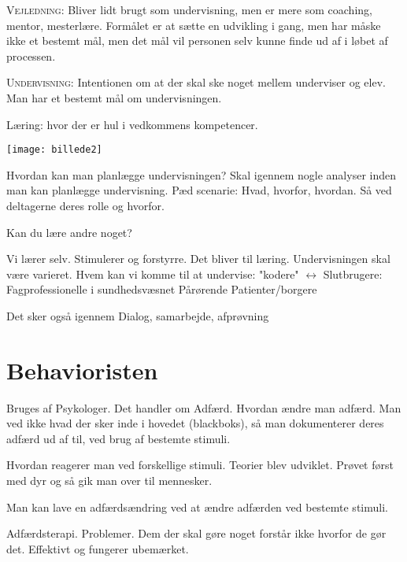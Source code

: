 \documentclass[12pt, letterpaper]{article}
\begin{document}
\textsc {Vejledning}: 
Bliver lidt brugt som undervisning, men er mere som coaching, mentor, mesterlære. Formålet er at sætte en udvikling i gang, men har måske ikke et bestemt mål, men det mål vil personen selv kunne finde ud af i løbet af processen. \newline 



\textsc {Undervisning}:
Intentionen om at der skal ske noget mellem underviser og elev. Man har et bestemt mål om undervisningen. 


Læring: hvor der er hul i vedkommens kompetencer. 

\begin{center}
\texttt{[image: billede2]}
\end{center}

Hvordan kan man planlægge undervisningen? Skal igennem nogle analyser inden man kan planlægge undervisning. Pæd scenarie: Hvad, hvorfor, hvordan. Så ved deltagerne deres rolle og hvorfor.


Kan du lære andre noget?

Vi lærer selv. Stimulerer og forstyrre.  Det bliver til læring. Undervisningen skal være varieret.
Hvem kan vi komme til at undervise:\newline
"kodere" $\leftrightarrow$ Slutbrugere:\newline
			Fagprofessionelle  i sundhedsvæsnet
			Pårørende
			Patienter/borgere \newline

Det sker også igennem Dialog, samarbejde, afprøvning


\newpage

\section*{Behavioristen} 


Bruges af Psykologer.
Det handler om Adfærd. Hvordan ændre man adfærd. Man ved ikke hvad der sker inde i hovedet (blackboks), så man dokumenterer deres adfærd ud af til, ved brug af bestemte stimuli.

Hvordan reagerer man ved forskellige stimuli. Teorier blev udviklet. Prøvet først med dyr og så gik man over til mennesker.

Man kan lave en adfærdsændring ved at ændre adfærden ved bestemte stimuli.  

Adfærdsterapi. Problemer. Dem der skal gøre noget forstår ikke hvorfor de gør det. Effektivt og fungerer ubemærket.
\end{document}
